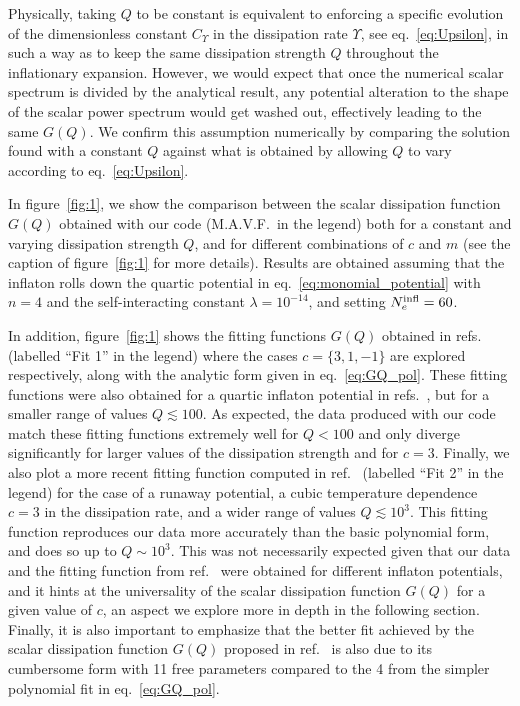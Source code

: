 \documentclass[a4paper,11pt]{article}
\begin{document}
Physically, taking $Q$ to be constant is equivalent to enforcing a specific evolution of the dimensionless constant $C_\Upsilon$ in the dissipation rate $\Upsilon$, see eq.~\eqref{eq:Upsilon}, in such a way as to keep the same dissipation strength $Q$ throughout the inflationary expansion. 
However, we would expect that once the numerical scalar spectrum is divided by the analytical result,
any potential alteration to the shape of the scalar power spectrum would get washed out, effectively leading to the same $G(Q)$. 
We confirm this assumption numerically by 
comparing
the solution found with a constant $Q$ against 
what is obtained by allowing $Q$ to vary according to eq.~\eqref{eq:Upsilon}. 

In figure~\ref{fig:1}, we show the comparison between the scalar dissipation function $G(Q)$ obtained with our code (M.A.V.F.\ in the legend) both for a constant and varying dissipation strength $Q$, and for different combinations of $c$ and $m$ (see the caption of figure~\ref{fig:1} for more details). 
Results are obtained assuming that the inflaton rolls down the quartic potential in eq.~\eqref{eq:monomial_potential} with $n=4$ and the self-interacting constant $\lambda=10^{-14}$, and setting $N_e^{\rm{infl}} = 60$. 


In addition, figure~\ref{fig:1} shows the fitting functions $G(Q)$ obtained in refs.~\cite{Bastero-Gil:2016qru,Benetti:2016jhf,Motaharfar:2018zyb} (labelled ``Fit 1'' in the legend) where the cases $c=\{3,1,-1\}$ are explored respectively, along with the analytic form given in eq.~\eqref{eq:GQ_pol}. These fitting functions were also obtained for a quartic inflaton potential in refs.~\cite{Bastero-Gil:2016qru,Benetti:2016jhf,Motaharfar:2018zyb}, but for a smaller range of values $Q \lesssim 100$. As expected, the data produced with our code match these fitting functions extremely well for $Q<100$ and only diverge significantly for larger values of the dissipation strength and for $c=3$. Finally, we also plot a more recent fitting function computed in ref.~\cite{Das:2020xmh} (labelled ``Fit 2'' in the legend) for the case of a runaway potential, a cubic temperature dependence $c=3$ in the dissipation rate, and a wider range of values $Q \lesssim 10^{3}$. This fitting function reproduces our data more accurately than the basic polynomial form, and does so up to  $Q \sim 10^{3}$. This was not necessarily expected given that our data and the fitting function from ref.~\cite{Das:2020xmh} were obtained for different inflaton potentials, and it hints at the universality of the scalar dissipation function $G(Q)$ for a given value of $c$, an aspect we explore more in depth in the following section. Finally, it is also important to emphasize that the better fit achieved by the scalar dissipation function $G(Q)$ proposed in ref.~\cite{Das:2020xmh} is also due to its cumbersome form with 11 free parameters compared to the 4 from the simpler polynomial fit in eq.~\eqref{eq:GQ_pol}.
\end{document}
